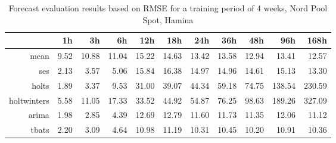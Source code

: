 \begin{table}[ht]
\centering
\begin{tabular}{rrrrrrrrrrr}
  \hline
 & 1h & 3h & 6h & 12h & 18h & 24h & 36h & 48h & 96h & 168h \\ 
  \hline
mean & 9.52 & 10.88 & 11.04 & 15.22 & 14.63 & 13.42 & 13.58 & 12.94 & 13.41 & 12.57 \\ 
  ses & 2.13 & 3.57 & 5.06 & 15.84 & 16.38 & 14.97 & 14.96 & 14.61 & 15.13 & 13.30 \\ 
  holts & 1.89 & 3.37 & 9.53 & 31.00 & 39.07 & 44.34 & 59.18 & 74.75 & 138.54 & 230.59 \\ 
  holtwinters & 5.58 & 11.05 & 17.33 & 33.52 & 44.92 & 54.87 & 76.25 & 98.63 & 189.26 & 327.09 \\ 
  arima & 1.98 & 2.85 & 4.39 & 12.69 & 12.79 & 11.60 & 11.73 & 11.35 & 12.06 & 11.12 \\ 
  tbats & 2.20 & 3.09 & 4.64 & 10.98 & 11.19 & 10.31 & 10.45 & 10.20 & 10.91 & 10.36 \\ 
   \hline
\end{tabular}
\caption{Forecast evaluation results based on RMSE for a training period of 4 weeks, Nord Pool Spot, Hamina}
\label{tab:app_results_hamina_4weeks}
\end{table}







